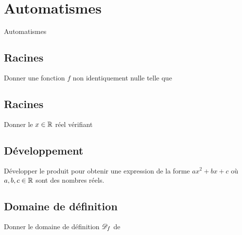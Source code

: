 
\AdvanceDate[2]



\section{Automatismes}

\begin{frame}

\centering \huge
Automatismes


\end{frame}

\subsection{Racines}

\begin{frame}{1}	
	Donner une fonction $f$ non identiquement nulle telle que

\end{frame}

\subsection{Racines}

\begin{frame}{2}	
	Donner le $x\in\mathbb{R}$ réel vérifiant
	\boxAB{
			\[ 21x + 11 = 0. \]
	}{
			\[ 24x - 5 = 0. \]
	}
\end{frame}


\subsection{Développement}

\begin{frame}{3}	
	Développer le produit pour obtenir une expression de la forme $ax^2 + bx + c$ où $a, b, c \in\mathbb{R}$ sont des nombres réels.
	\boxAB{
			\[ (x - 5)(6x + 3) \]
	}{
			\[ (3x + 2)(2x - 1) \]
	}
\end{frame}

\subsection{Domaine de définition}

\begin{frame}{4}	
	Donner le domaine de définition $\mathcal{D}_f$ de
	\boxAB{
			\[ f(x) = \dfrac{4}{11-x}. \]
	}{
			\[ f(x) = \dfrac{2}{x-23}. \]
	}
\end{frame}


